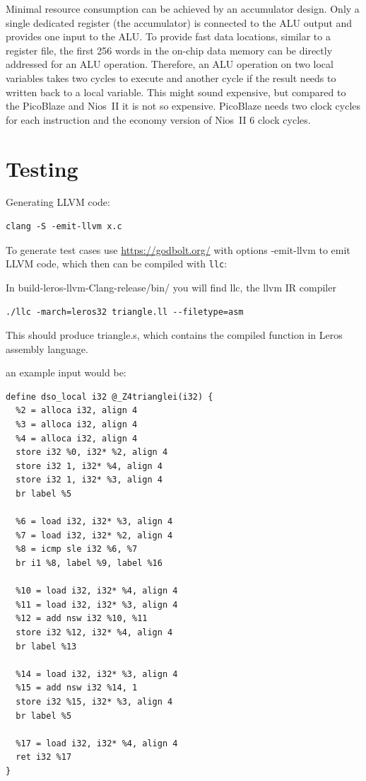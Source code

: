 \documentclass[a4paper,fontsize=10pt,twoside,DIV15,BCOR12mm,headinclude=true,footinclude=false,pagesize,bibtotoc]{scrbook}
\newcommand{\code}[1]{{\small{\texttt{#1}}}}
\begin{document}
Minimal resource consumption can be achieved by an accumulator design. Only a single dedicated register (the accumulator) is connected to the ALU output and provides one input to the ALU. To provide fast data locations, similar to a register file, the first 256 words in the on-chip data memory can be directly addressed for an ALU operation. Therefore, an ALU operation on two local variables takes two cycles to execute and another cycle if the result needs to written back to a local variable. This might sound expensive, but compared to the PicoBlaze and Nios~II it is not so expensive. PicoBlaze needs two clock cycles for each instruction and the economy version of Nios~II 6 clock cycles.

\chapter{Testing}

Generating LLVM code:

\begin{verbatim}
clang -S -emit-llvm x.c
\end{verbatim}

To generate test cases use \url{https://godbolt.org/} with options -emit-llvm to emit LLVM code,
which then can be compiled with \code{llc}:

In build-leros-llvm-Clang-release/bin/ you will find llc, the llvm IR compiler

\begin{verbatim}
./llc -march=leros32 triangle.ll --filetype=asm
\end{verbatim}
This should produce triangle.s, which contains the compiled function in Leros assembly language. 

an example input would be:

\begin{verbatim}
define dso_local i32 @_Z4trianglei(i32) {
  %2 = alloca i32, align 4
  %3 = alloca i32, align 4
  %4 = alloca i32, align 4
  store i32 %0, i32* %2, align 4
  store i32 1, i32* %4, align 4
  store i32 1, i32* %3, align 4
  br label %5

  %6 = load i32, i32* %3, align 4
  %7 = load i32, i32* %2, align 4
  %8 = icmp sle i32 %6, %7
  br i1 %8, label %9, label %16

  %10 = load i32, i32* %4, align 4
  %11 = load i32, i32* %3, align 4
  %12 = add nsw i32 %10, %11
  store i32 %12, i32* %4, align 4
  br label %13

  %14 = load i32, i32* %3, align 4
  %15 = add nsw i32 %14, 1
  store i32 %15, i32* %3, align 4
  br label %5

  %17 = load i32, i32* %4, align 4
  ret i32 %17
}
\end{verbatim}
\end{document}
